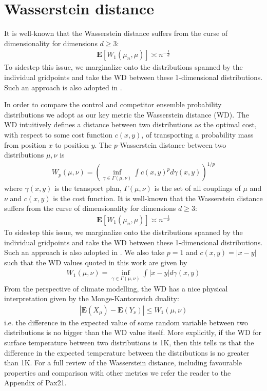 \documentclass[fleqn,usenatbib,useAMS]{mnras}
\begin{document}
\section{Wasserstein distance}\label{sec:wasserstein}



It is well-known \cite{Dudley} that the Wasserstein distance suffers from the curse of dimensionality for dimensions $d \geq 3$:
\begin{eqnarray}
	\boldsymbol{E} [W_1(\mu_n,\mu)] \asymp n^{-\frac{1}{d}}
\end{eqnarray}
To sidestep this issue, we marginalize onto the distributions spanned by the individual gridpoints and take the WD between these 1-dimensional distributions. Such an approach is also adopted in \cite{Paxton2021,Vissio2020}. 





In order to compare the control and competitor ensemble probability distributions we adopt as our key metric the Wasserstein distance (WD). The WD intuitively defines a distance between two distributions as the optimal cost, with respect to some cost function $c(x,y)$,  of transporting a probability mass from position $x$ to position $y$. The $p$-Wasserstein distance between two distributions $\mu, \nu$ is
\begin{eqnarray}
	W_p(\mu,\nu)= \left( \inf_{\gamma \in \Gamma(\mu, \nu)}  \int c(x,y)^p d \gamma (x,y)\right)^{1/p}
\end{eqnarray}
where $\gamma(x,y)$ is the transport plan, $\Gamma(\mu, \nu)$ is the set of all couplings of $\mu$ and $\nu$ and $c(x,y)$ is the cost function. It is well-known \cite{Dudley} that the Wasserstein distance suffers from the curse of dimensionality for dimensions $d \geq 3$:
\begin{eqnarray}
	\boldsymbol{E} [W_1(\mu_n,\mu)] \asymp n^{-\frac{1}{d}}
\end{eqnarray}
To sidestep this issue, we marginalize onto the distributions spanned by the individual gridpoints and take the WD between these 1-dimensional distributions. Such an approach is also adopted in \cite{Paxton2021,Vissio2020}. We also take $p=1$ and $c(x,y) = |x-y|$ such that the WD values quoted in this work are given by
\begin{eqnarray}
	W_1(\mu,\nu)=  \inf_{\gamma \in \Gamma(\mu, \nu)} \int |x-y| d \gamma (x,y)
\end{eqnarray}
From the perspective of climate modelling, the WD has a nice physical interpretation given by the Monge-Kantorovich duality:
\begin{eqnarray}
	| \boldsymbol{E}(X_{\mu} )-\boldsymbol{E}(Y_{\nu} ) | \leq W_1(\mu, \nu) \label{eq:WDdefn}
\end{eqnarray}
i.e. the difference in the expected value of some random variable between two distributions is no bigger than the WD value itself. More explicitly, if the WD for surface temperature between two distributions is 1K, then this tells us that the difference in the expected temperature between the distributions is no greater than 1K. For a full review of the Wasserstein distance, including favourable properties and comparison with other metrics we refer the reader to the Appendix of Pax21.
\end{document}
